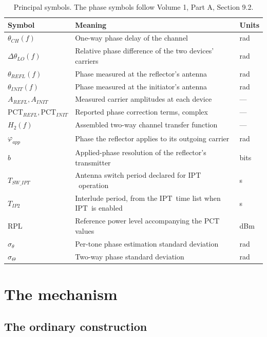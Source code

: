 \documentclass[11pt,a4paper]{article}
\newcommand{\PCT}{\ensuremath{\mathrm{PCT}}}
\newcommand{\IPT}{\ensuremath{\mathrm{IPT}}}
\newcommand{\RPL}{\ensuremath{\mathrm{RPL}}}
\newcommand{\Tswipt}{T_{SW\_IPT}}
\newcommand{\Tiptwo}{T_{IP2}}
\begin{document}
\begin{table}[h]
\caption{Principal symbols. The phase symbols follow Volume 1, Part A, Section 9.2.}
\label{tab:symbols}
\centering\small
\begin{tabular}{@{}L{34mm}L{72mm}L{22mm}@{}}
\toprule
Symbol & Meaning & Units \\
\midrule
$\theta_{CH}(f)$ & One-way phase delay of the channel & rad \\
$\Delta\theta_{LO}(f)$ & Relative phase difference of the two devices' carriers & rad \\
$\theta_{REFL}(f)$ & Phase measured at the reflector's antenna & rad \\
$\theta_{INIT}(f)$ & Phase measured at the initiator's antenna & rad \\
$A_{REFL},A_{INIT}$ & Measured carrier amplitudes at each device & --- \\
$\PCT_{REFL},\PCT_{INIT}$ & Reported phase correction terms, complex & --- \\
$H_2(f)$ & Assembled two-way channel transfer function & --- \\
$\varphi_{app}$ & Phase the reflector applies to its outgoing carrier & rad \\
$b$ & Applied-phase resolution of the reflector's transmitter & bits \\
$\Tswipt$ & Antenna switch period declared for \IPT\ operation & s \\
$\Tiptwo$ & Interlude period, from the \IPT\ time list when \IPT\ is enabled & s \\
$\RPL$ & Reference power level accompanying the $\PCT$ values & dBm \\
$\sigma_\theta$ & Per-tone phase estimation standard deviation & rad \\
$\sigma_\Theta$ & Two-way phase standard deviation & rad \\
\bottomrule
\end{tabular}
\end{table}

\section{The mechanism}
\label{sec:mech}

\subsection{The ordinary construction}
\end{document}
